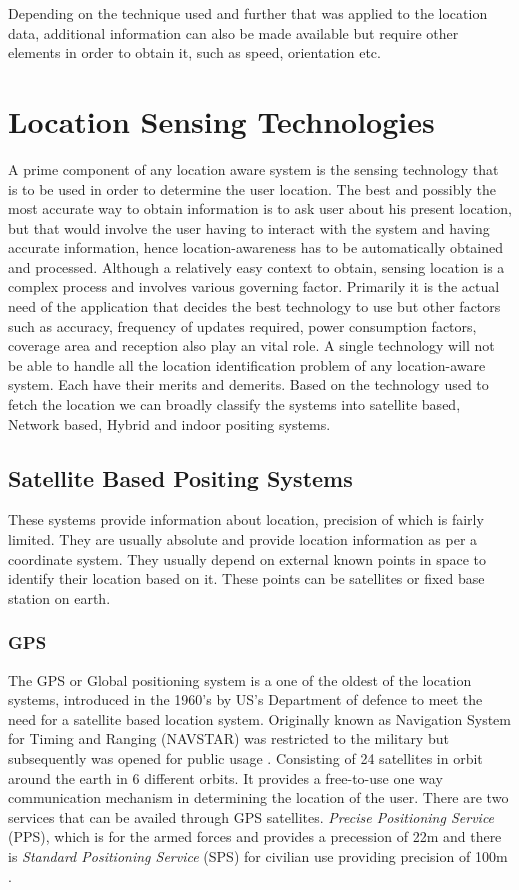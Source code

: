 \documentclass[12pt]{report}
\begin{document}
Depending on the technique used and further that was applied to the location data, additional information can also be made available but require other elements in order to obtain it, such as speed, orientation etc.

\section {Location Sensing Technologies}
A prime component of any location aware system is the sensing technology that is to be used in order to determine the user location. The best and possibly the most accurate way to obtain information is to ask user about his present location, but that would involve the user having to interact with the system and having accurate information, hence location-awareness has to be automatically obtained and processed. Although a relatively easy context to obtain, sensing location is a complex process and involves various governing factor. Primarily it is the actual need of the application that decides the best technology to use but other factors such as accuracy, frequency of updates required, power consumption factors, coverage area and reception also play an vital role. A single technology will not be able to handle all the location identification problem of any location-aware system. Each have their merits and demerits. Based on the technology used to fetch the location we can broadly classify the systems into satellite based, Network based, Hybrid and indoor positing systems.

\subsection{Satellite Based Positing Systems}
These systems provide information about location, precision of which is fairly limited. They are usually absolute and provide location information as per a coordinate system. They usually depend on external known points in space to identify their location based on it. These points can be satellites or fixed base station on earth.

\subsubsection{GPS}
The GPS or Global positioning system is a one of the oldest of the location systems, introduced in the 1960's by US's Department of defence to meet the need for a satellite based location system. Originally known as Navigation System for Timing and Ranging (NAVSTAR) was restricted to the military but subsequently was opened for public usage \cite{ta2011global}. Consisting of 24 satellites in orbit around the earth in 6 different orbits. It provides a free-to-use one way communication mechanism in determining the location of the user. There are two services that can be availed through GPS satellites. \textit{Precise Positioning Service} (PPS), which is for the armed forces and provides a precession of 22m and there is \textit{Standard Positioning Service} (SPS) for civilian use providing precision of 100m \cite{schiller2004location}.
 
\end{document}
